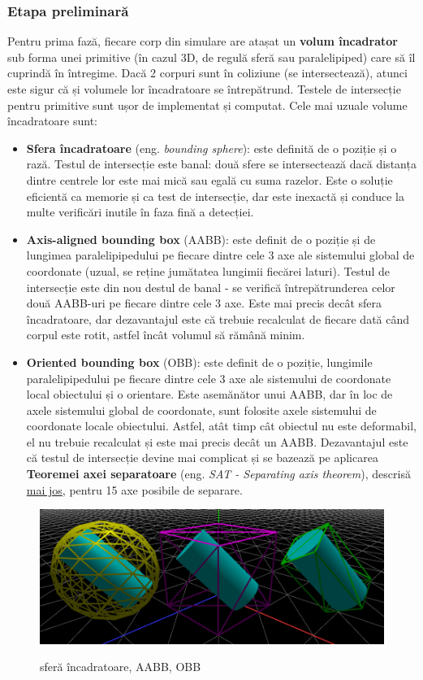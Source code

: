 \documentclass[12pt,a4paper]{report}
\providecommand{\DIFaddtex}[1]{{\protect\color{blue}\uwave{#1}}} %
\providecommand{\DIFaddbegin}{} %
\providecommand{\DIFaddend}{} %
\providecommand{\DIFadd}[1]{\texorpdfstring{\DIFaddtex{#1}}{#1}} %
\newcommand{\DIFaddincludegraphics}[2][]{{\color{blue}\fbox{\DIFOincludegraphics[#1]{#2}}}} %
\DeclareRobustCommand{\DIFaddbegin}{\DIFOaddbegin \let\includegraphics\DIFaddincludegraphics} %
\DeclareRobustCommand{\DIFaddend}{\DIFOaddend \let\includegraphics\DIFOincludegraphics} %
\begin{document}
	\subsubsection{Etapa preliminară}
	Pentru prima fază, fiecare corp din simulare are atașat un \textbf{volum încadrator} sub forma unei primitive (în cazul 3D, de regulă sferă sau paralelipiped) care să îl cuprindă în întregime. Dacă 2 corpuri sunt în coliziune (se intersectează), atunci este sigur că și volumele lor încadratoare se întrepătrund. Testele de intersecție pentru primitive sunt ușor de implementat și computat.
	Cele mai uzuale volume încadratoare sunt:
	\begin{itemize}
		\item \textbf{Sfera încadratoare} (eng. \textit{bounding sphere}): este definită de o poziție și o rază. Testul de intersecție este banal: două sfere se intersectează dacă distanța dintre centrele lor este mai mică sau egală cu suma razelor. Este o soluție eficientă ca memorie și ca test de intersecție, dar este inexactă și conduce la multe verificări inutile în faza fină a detecției.
		\item \textbf{Axis-aligned bounding box} (AABB): este definit de o poziție și de lungimea paralelipipedului pe fiecare dintre cele 3 axe ale sistemului global de coordonate (uzual, se reține jumătatea lungimii fiecărei laturi). Testul de intersecție este din nou destul de banal - se verifică întrepătrunderea celor două AABB-uri pe fiecare dintre cele 3 axe. Este mai precis decât sfera încadratoare, dar dezavantajul este că trebuie recalculat de fiecare dată când corpul este rotit, astfel încât volumul să rămână minim.
		\item \textbf{Oriented bounding box} (OBB): este definit de o poziție, lungimile paralelipipedului pe fiecare dintre cele 3 axe ale sistemului de coordonate local obiectului și o orientare. Este asemănător unui AABB, dar în loc de axele sistemului global de coordonate, sunt folosite axele sistemului de coordonate locale \DIFaddbegin \DIFadd{ale }\DIFaddend obiectului. Astfel, atât timp cât obiectul nu este deformabil, el nu trebuie recalculat și este mai precis decât un AABB. Dezavantajul este că testul de intersecție devine mai complicat și se bazează pe aplicarea \textbf{Teoremei axei separatoare} (eng. \textit{SAT - Separating axis theorem}), descrisă \hyperref[SAT]{mai jos}, pentru 15 axe posibile de separare.
	\end{itemize}
	\begin{figure}[H]
		\centering
		\includegraphics[width=0.7\linewidth]{pics/cap3_00.png}
		\label{fig:cap3_00}
		\caption[volume încadratoare uzuale]{sferă încadratoare, AABB, OBB}
	\end{figure}
\end{document}

